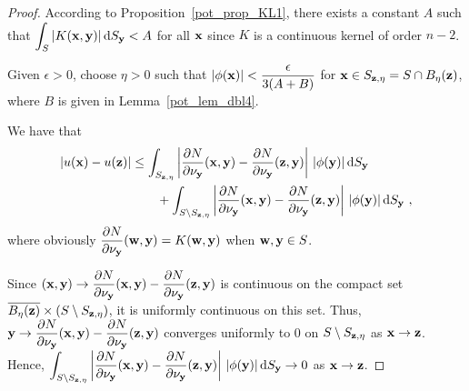 \begin{proof}
According to Proposition~\ref{pot_prop_KL1}, there exists a constant $A$
such that $\displaystyle \int_S |K(\mathbf{x},\mathbf{y})| \,\mathrm{d}{S}_{\mathbf{y}} < A$
for all $\mathbf{x}$ since $K$ is a continuous kernel of order $n-2$.

Given $\epsilon > 0$, choose $\eta > 0$ such that
$\displaystyle |\phi(\mathbf{x})| < \frac{\epsilon}{3(A+B)}$
for $\mathbf{x} \in S_{\mathbf{z},\eta} = S \cap B_{\eta}(\mathbf{z})$, where $B$ is
given in Lemma~\ref{pot_lem_dbl4}.

We have that
\begin{equation} \label{potLemDbl5equ1}
\begin{split}
|u(\mathbf{x}) - u(\mathbf{z})|
& \leq \int_{S_{\mathbf{z},\eta}} \left| \frac{\partial{N}}{\partial \mathbf{\nu}_{\mathbf{y}}}
(\mathbf{x},\mathbf{y}) - \frac{\partial{N}}{\partial \mathbf{\nu}_{\mathbf{y}}} (\mathbf{z},\mathbf{y})
\right|\,|\phi(\mathbf{y})| \,\mathrm{d}{S}_{\mathbf{y}} \\
&\qquad + \int_{S \setminus S_{\mathbf{z},\eta}} \left| \frac{\partial{N}}{\partial \mathbf{\nu}_{\mathbf{y}}}
(\mathbf{x},\mathbf{y}) - \frac{\partial{N}}{\partial \mathbf{\nu}_{\mathbf{y}}} (\mathbf{z},\mathbf{y})
\right|\,|\phi(\mathbf{y})| \,\mathrm{d}{S}_{\mathbf{y}} \ ,
\end{split}
\end{equation}
where obviously
$\displaystyle \frac{\partial{N}}{\partial \mathbf{\nu}_{\mathbf{y}}} (\mathbf{w},\mathbf{y})
= K(\mathbf{w},\mathbf{y})$ when $\mathbf{w}, \mathbf{y} \in S$.

Since
$\displaystyle (\mathbf{x},\mathbf{y}) \to 
\frac{\partial{N}}{\partial \mathbf{\nu}_{\mathbf{y}}}
(\mathbf{x},\mathbf{y}) - \frac{\partial{N}}{\partial \mathbf{\nu}_{\mathbf{y}}} (\mathbf{z},\mathbf{y})$
is continuous on the compact set 
$\displaystyle
\overline{B_\eta(\mathbf{z})} \times \left(S \setminus S_{\mathbf{z},\eta}\right)$,
it is uniformly continuous on this set.  Thus,
$\displaystyle \mathbf{y} \to
\frac{\partial{N}}{\partial \mathbf{\nu}_{\mathbf{y}}}
(\mathbf{x},\mathbf{y}) - \frac{\partial{N}}{\partial \mathbf{\nu}_{\mathbf{y}}} (\mathbf{z},\mathbf{y})$
converges uniformly to $0$ on $S \setminus S_{\mathbf{z},\eta}$ as
$\mathbf{x} \to \mathbf{z}$.  Hence,
$\displaystyle
\int_{S \setminus S_{\mathbf{z},\eta}} \left| \frac{\partial{N}}{\partial \mathbf{\nu}_{\mathbf{y}}}
(\mathbf{x},\mathbf{y}) - \frac{\partial{N}}{\partial \mathbf{\nu}_{\mathbf{y}}} (\mathbf{z},\mathbf{y})
\right|\,|\phi(\mathbf{y})| \,\mathrm{d}{S}_{\mathbf{y}} \to 0$ as
$\mathbf{x} \to \mathbf{z}$.


\end{proof}

